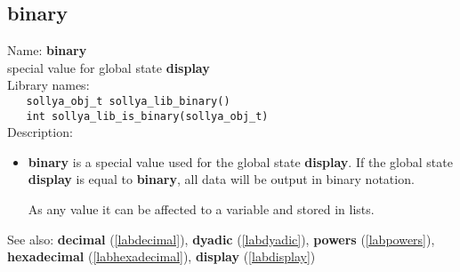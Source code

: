 \subsection{binary}
\label{labbinary}
\noindent Name: \textbf{binary}\\
\phantom{aaa}special value for global state \textbf{display}\\[0.2cm]
\noindent Library names:\\
\verb|   sollya_obj_t sollya_lib_binary()|\\
\verb|   int sollya_lib_is_binary(sollya_obj_t)|\\[0.2cm]
\noindent Description: \begin{itemize}

\item \textbf{binary} is a special value used for the global state \textbf{display}.  If
   the global state \textbf{display} is equal to \textbf{binary}, all data will be
   output in binary notation.
    
   As any value it can be affected to a variable and stored in lists.
\end{itemize}
See also: \textbf{decimal} (\ref{labdecimal}), \textbf{dyadic} (\ref{labdyadic}), \textbf{powers} (\ref{labpowers}), \textbf{hexadecimal} (\ref{labhexadecimal}), \textbf{display} (\ref{labdisplay})
